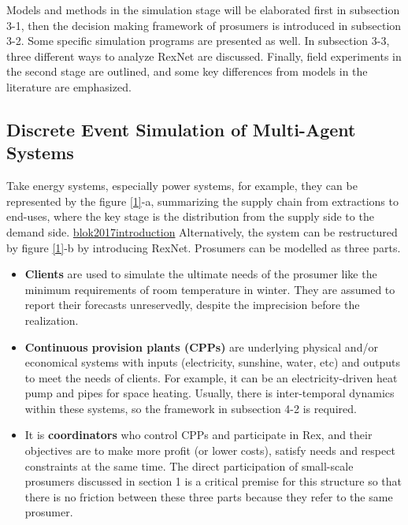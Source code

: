 \documentclass[letterpaper,8pt,twocolumn,twoside,]{pinp}
\providecommand{\tightlist}{%
  \setlength{\itemsep}{0pt}\setlength{\parskip}{0pt}}
\begin{document}
Models and methods in the simulation stage will be elaborated first in
subsection 3-1, then the decision making framework of prosumers is
introduced in subsection 3-2. Some specific simulation programs are
presented as well. In subsection 3-3, three different ways to analyze
RexNet are discussed. Finally, field experiments in the second stage are
outlined, and some key differences from models in the literature are
emphasized.

\hypertarget{discrete-event-simulation-of-multi-agent-systems}{%
\subsection{Discrete Event Simulation of Multi-Agent
Systems}\label{discrete-event-simulation-of-multi-agent-systems}}

Take energy systems, especially power systems, for example, they can be
represented by the figure \ref{1}-a, summarizing the supply chain from
extractions to end-uses, where the key stage is the distribution from
the supply side to the demand side.
\protect\hyperlink{reference}{blok2017introduction} Alternatively, the
system can be restructured by figure \ref{1}-b by introducing RexNet.
Prosumers can be modelled as three parts.

\begin{itemize}
\tightlist
\item
  \textbf{Clients} are used to simulate the ultimate needs of the
  prosumer like the minimum requirements of room temperature in winter.
  They are assumed to report their forecasts unreservedly, despite the
  imprecision before the realization.
\item
  \textbf{Continuous provision plants (CPPs)} are underlying physical
  and/or economical systems with inputs (electricity, sunshine, water,
  etc) and outputs to meet the needs of clients. For example, it can be
  an electricity-driven heat pump and pipes for space heating. Usually,
  there is inter-temporal dynamics within these systems, so the
  framework in subsection 4-2 is required.
\item
  It is \textbf{coordinators} who control CPPs and participate in Rex,
  and their objectives are to make more profit (or lower costs), satisfy
  needs and respect constraints at the same time. The direct
  participation of small-scale prosumers discussed in section 1 is a
  critical premise for this structure so that there is no friction
  between these three parts because they refer to the same prosumer.
\end{itemize}
\end{document}
